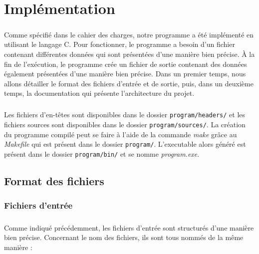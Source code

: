\chapter{Implémentation}


	\paragraph{}
	Comme spécifié dans le cahier des charges, notre programme a été implémenté en utilisant le langage C. Pour fonctionner, le programme a besoin d'un fichier contenant différentes données qui sont présentées d'une manière bien précise. À la fin de l'exécution, le programme crée un fichier de sortie contenant des données également présentées d'une manière bien précise. Dans un premier temps, nous allons détailler le format des fichiers d'entrée et de sortie, puis, dans un deuxième temps, la documentation qui présente l'architecture du projet.
	
	\paragraph{}
	Les fichiers d'en-têtes sont disponibles dans le dossier \texttt{program/headers/} et les fichiers sources sont disponibles dans le dossier \texttt{program/sources/}. La création du programme compilé peut se faire à l'aide de la commande \textit{make} grâce au \textit{Makefile} qui est présent dans le dossier \texttt{program/}. L'executable alors généré est présent dans le dossier \texttt{program/bin/} et se nomme \textit{program.exe}.
%

	\section{Format des fichiers}
		\subsection{Fichiers d'entrée}
	
	\paragraph{}
	Comme indiqué précédemment, les fichiers d'entrée sont structurés d'une manière bien précise. Concernant le nom des fichiers, ils sont tous nommés de la même manière :
